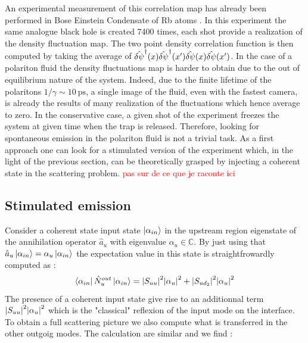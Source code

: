  An experimental measurement of this correlation map has already been performed in Bose Einstein Condensate of Rb atoms \cite{steinhauer_observation_2016}.
 In this experiment the same analogue black hole is created 7400 times, each shot provide a realization of the density fluctuation map. The two point density correlation
 function is then computed by taking the average of $\hat{\delta\psi}^\dagger(x)\hat{\delta\psi}^\dagger(x')\hat{\delta\psi}(x)\hat{\delta\psi}(x')$. 
 In the case of a polariton fluid the density fluctuations map is harder to obtain due to 
 the out of equilibrium nature of the system. Indeed, due to the finite lifetime of the polaritons $1/\gamma\sim \SI{10}{\pico \second}$, a single 
 image of the fluid, even with the fastest camera, is already the results of many realization of the fluctuations which hence average to zero. In the conservative case,
 a given shot of the experiment freezes the system at given time when the trap is released. Therefore, looking for spontaneous
 emission in the polariton fluid is not a trivial task. As a first approach one can look for a stimulated version of the experiment which, in the light of the previous section,
 can be theoretically grasped by injecting a coherent state in the scattering problem.
 \textcolor{red}{pas sur de ce que je raconte ici}

\subsection{Stimulated emission}

Consider a coherent state input state $\ket{\alpha_{in}}$ in the upstream region eigenstate of the annihilation operator $\hat{a}_u$ with eigenvalue $\alpha_u \in \mathbb{C}$.
By just using that $\hat{a}_u\ket{\alpha_{in}}=\alpha_u\ket{\alpha_{in}}$ the expectation value in this state is straightfrowardly computed as :
\begin{equation}
    \bra{\alpha_{in}}\hat{N}_u^{out}\ket{\alpha_{in}} = \abs{S_{uu}}^2\abs{\alpha_u}^2 + \abs{S_{ud_2}}^2\abs{\alpha_u}^2
    \label{eq:stimulated_expectation_value}
\end{equation}
The presence of a coherent input state give rise to an additionnal term $\abs{S_{uu}}^2\abs{\alpha_u}^2$ which is the "classical" reflexion of the input mode on the interface.
To obtain a full scattering picture we also compute what is transferred in the other outgoig modes. The calculation are similar and we find :


